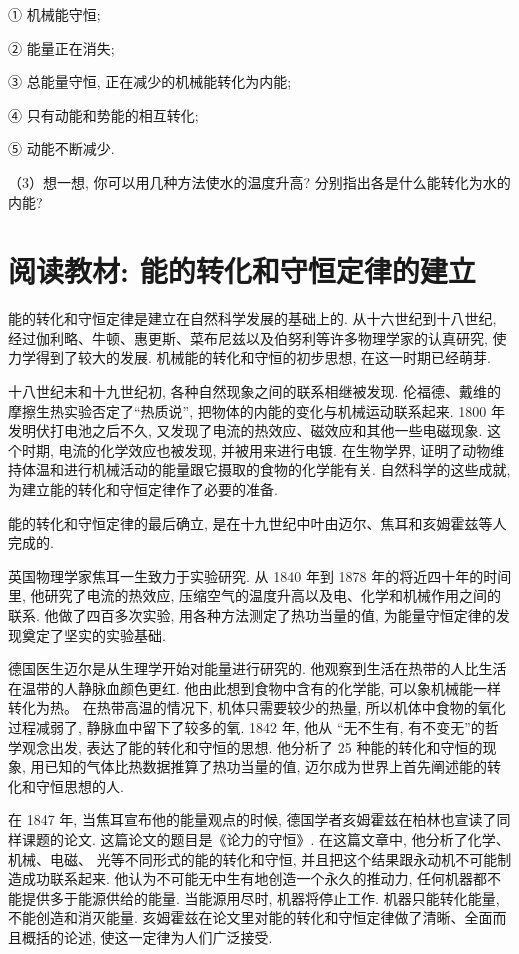 \documentclass[10pt]{article}
\begin{document}
① 机械能守恒;

② 能量正在消失;

③ 总能量守恒, 正在减少的机械能转化为内能;

④ 只有动能和势能的相互转化;

⑤ 动能不断减少.

（3）想一想, 你可以用几种方法使水的温度升高? 分别指出各是什么能转化为水的内能?

\section*{阅读教材: 能的转化和守恒定律的建立}

能的转化和守恒定律是建立在自然科学发展的基础上的. 从十六世纪到十八世纪, 经过伽利略、牛顿、惠更斯、菜布尼兹以及伯努利等许多物理学家的认真研究, 使力学得到了较大的发展. 机械能的转化和守恒的初步思想, 在这一时期已经萌芽.

十八世纪末和十九世纪初, 各种自然现象之间的联系相继被发现. 伦福德、戴维的摩擦生热实验否定了“热质说”, 把物体的内能的变化与机械运动联系起来. 1800 年发明伏打电池之后不久, 又发现了电流的热效应、磁效应和其他一些电磁现象. 这个时期, 电流的化学效应也被发现, 并被用来进行电镀. 在生物学界, 证明了动物维持体温和进行机械活动的能量跟它摄取的食物的化学能有关. 自然科学的这些成就, 为建立能的转化和守恒定律作了必要的准备.

能的转化和守恒定律的最后确立, 是在十九世纪中叶由迈尔、焦耳和亥姆霍兹等人完成的.

英国物理学家焦耳一生致力于实验研究. 从 1840 年到 1878 年的将近四十年的时间里, 他研究了电流的热效应, 压缩空气的温度升高以及电、化学和机械作用之间的联系. 他做了四百多次实验, 用各种方法测定了热功当量的值, 为能量守恒定律的发现奠定了坚实的实验基础.

德国医生迈尔是从生理学开始对能量进行研究的. 他观察到生活在热带的人比生活在温带的人静脉血颜色更红. 他由此想到食物中含有的化学能, 可以象机械能一样转化为热。 在热带高温的情况下, 机体只需要较少的热量, 所以机体中食物的氧化过程减弱了, 静脉血中留下了较多的氧. 1842 年, 他从 “无不生有, 有不变无”的哲学观念出发, 表达了能的转化和守恒的思想. 他分析了 25 种能的转化和守恒的现象, 用已知的气体比热数据推算了热功当量的值, 迈尔成为世界上首先阐述能的转化和守恒思想的人.

在 1847 年, 当焦耳宣布他的能量观点的时候, 德国学者亥姆霍兹在柏林也宣读了同样课题的论文. 这篇论文的题目是《论力的守恒》. 在这篇文章中, 他分析了化学、机械、电磁、 光等不同形式的能的转化和守恒, 并且把这个结果跟永动机不可能制造成功联系起来. 他认为不可能无中生有地创造一个永久的推动力, 任何机器都不能提供多于能源供给的能量. 当能源用尽时, 机器将停止工作. 机器只能转化能量, 不能创造和消灭能量. 亥姆霍兹在论文里对能的转化和守恒定律做了清晰、全面而且概括的论述, 使这一定律为人们广泛接受.
\end{document}
